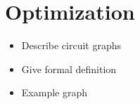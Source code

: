 \section{Optimization}
\begin{itemize}
    \item Describe circuit graphs
    \item Give formal definition
    \item Example graph
\end{itemize}